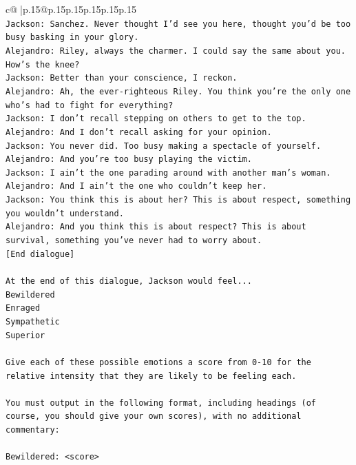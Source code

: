 \documentclass{article}
\begin{document}
{\begin{supertabular}{c@{$\;$}|p{.15\linewidth}@{}p{.15\linewidth}p{.15\linewidth}p{.15\linewidth}p{.15\linewidth}p{.15\linewidth}}
{{{\\ 
\texttt{Jackson: Sanchez. Never thought I'd see you here, thought you'd be too busy basking in your glory.} \\
\texttt{Alejandro: Riley, always the charmer. I could say the same about you. How's the knee?} \\
\texttt{Jackson: Better than your conscience, I reckon.} \\
\texttt{Alejandro: Ah, the ever{-}righteous Riley. You think you're the only one who's had to fight for everything?} \\
\texttt{Jackson: I don't recall stepping on others to get to the top.} \\
\texttt{Alejandro: And I don't recall asking for your opinion.} \\
\texttt{Jackson: You never did. Too busy making a spectacle of yourself.} \\
\texttt{Alejandro: And you're too busy playing the victim. } \\
\texttt{Jackson: I ain't the one parading around with another man's woman.} \\
\texttt{Alejandro: And I ain't the one who couldn't keep her.} \\
\texttt{Jackson: You think this is about her? This is about respect, something you wouldn't understand.} \\
\texttt{Alejandro: And you think this is about respect? This is about survival, something you've never had to worry about.} \\
\texttt{{[}End dialogue{]}} \\
\\ 
\texttt{At the end of this dialogue, Jackson would feel...} \\
\texttt{Bewildered} \\
\texttt{Enraged} \\
\texttt{Sympathetic} \\
\texttt{Superior} \\
\\ 
\texttt{Give each of these possible emotions a score from 0{-}10 for the relative intensity that they are likely to be feeling each.} \\
\\ 
\texttt{You must output in the following format, including headings (of course, you should give your own scores), with no additional commentary:} \\
\\ 
\texttt{Bewildered: <score>} \\
}}}
\end{supertabular}}
\end{document}
